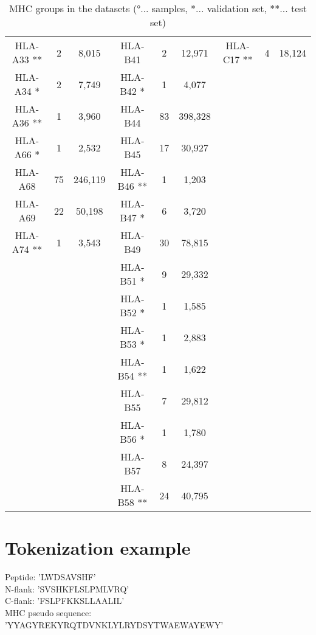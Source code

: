 \documentclass[msc,deptreport,ai]{infthesis} %
\begin{document}
\begin{table}[H]
\begin{center}
\begin{footnotesize}
\begin{sc}
\begin{tabular}{| c c c | c c c | c c c |}
		HLA-A33 ** 		&  2   			&   8,015		& HLA-B41   		&  2   			&  12,971 		& HLA-C17 **	&  4   			&  18,124\\
		HLA-A34 * 		&  2   			&   7,749		& HLA-B42 * 		&  1   			&   4,077 		& 			&			& \\
		HLA-A36 **   	&  1   			&   3,960		& HLA-B44   		& 83   			& 398,328 		& 			&			& \\
		HLA-A66 *  		&  1   			&   2,532		& HLA-B45   		& 17   			&  30,927 		& 			&			& \\
		HLA-A68   		& 75   			& 246,119		& HLA-B46 **	&  1   			&   1,203 		& 			& 			& \\
		HLA-A69   		& 22   			&  50,198		& HLA-B47 *		&  6   			&   3,720 		& 			&			& \\
		HLA-A74 **  		&  1   			&   3,543		& HLA-B49   		& 30   			&  78,815 		& 			&			& \\
					&			&			& HLA-B51 *		&  9   			&  29,332 		& 			&			& \\
					&			&			& HLA-B52 * 		&  1   			&   1,585 		& 			&			& \\
					&			&			& HLA-B53 * 		&  1   			&   2,883 		& 			&			& \\
					&			&			& HLA-B54 **	&  1   			&   1,622 		& 			&			& \\
					&			&			& HLA-B55   		&  7   			&  29,812 		& 			&			& \\
					&			&			& HLA-B56 * 		&  1   			&   1,780 		& 			&			& \\
					&			&			& HLA-B57   		&  8   			&  24,397 		& 			&			& \\
					&			&			& HLA-B58 **	& 24   			&  40,795 		& 			&			& \\
		\hline
		\end{tabular}
		\end{sc}
		\end{footnotesize}
		\caption{MHC groups in the datasets (°... samples, *... validation set, **... test set)}
		\label{tab:split_mhc}
		\end{center}
		\vskip -7mm
		\end{table}
			
	\section{Tokenization example}
	
		Peptide: 'LWDSAVSHF' \\
		N-flank: 'SVSHKFLSLPMLVRQ' \\
		C-flank: 'FSLPFKKSLLAALIL' \\
		MHC pseudo sequence: 'YYAGYREKYRQTDVNKLYLRYDSYTWAEWAYEWY' \\
		
\end{document}

